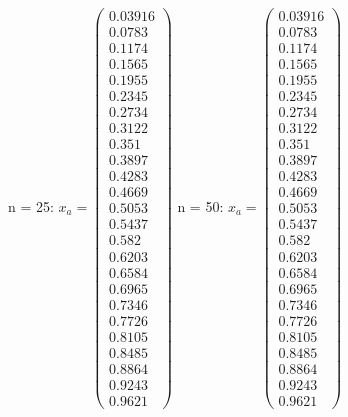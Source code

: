 \documentclass{udpreport}
\begin{document}
\begin{enumerate}
\begin{enumerate}
 	        n = 25: 
 	       	$x_{a} = \left(\begin{array}{c} 0.03916\\ 0.0783\\ 0.1174\\ 0.1565\\ 0.1955\\ 0.2345\\ 0.2734\\ 0.3122\\ 0.351\\ 0.3897\\ 0.4283\\ 0.4669\\ 0.5053\\ 0.5437\\ 0.582\\ 0.6203\\ 0.6584\\ 0.6965\\ 0.7346\\ 0.7726\\ 0.8105\\ 0.8485\\ 0.8864\\ 0.9243\\ 0.9621 \end{array}\right) $
 	        n = 50:
 	        $x_{a} = \left(\begin{array}{c} 0.03916\\ 0.0783\\ 0.1174\\ 0.1565\\ 0.1955\\ 0.2345\\ 0.2734\\ 0.3122\\ 0.351\\ 0.3897\\ 0.4283\\ 0.4669\\ 0.5053\\ 0.5437\\ 0.582\\ 0.6203\\ 0.6584\\ 0.6965\\ 0.7346\\ 0.7726\\ 0.8105\\ 0.8485\\ 0.8864\\ 0.9243\\ 0.9621 \end{array}\right)$
 	        

\end{enumerate}
\end{enumerate}
\end{document}

